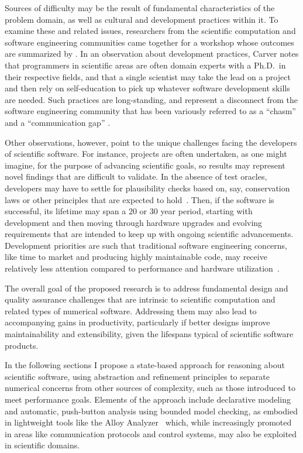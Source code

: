 \documentclass[12pt]{article}
\begin{document}
Sources of difficulty may be the result of fundamental characteristics
of the problem domain, as well as cultural and development practices
within it.  To examine these and related issues, researchers from the
scientific computation and software engineering communities came
together for a workshop whose outcomes are summarized by
\cite{carver2009}.  In an observation about development practices,
Carver notes that programmers in scientific areas are often domain
experts with a Ph.D.\ in their respective fields, and that a single
scientist may take the lead on a project and then rely on
self-education to pick up whatever software development skills are
needed.  Such practices are long-standing, and represent a disconnect
from the software engineering community that has been variously
referred to as a ``chasm'' \citep{kelly2007,sanders2008} and a
``communication gap'' \citep{faulk2009}.

Other observations, however, point to the unique challenges facing the
developers of scientific software.  For instance, projects are often
undertaken, as one might imagine, for the purpose of advancing
scientific goals, so results may represent novel findings that are
difficult to validate.  In the absence of test oracles, developers may
have to settle for plausibility checks based on, say, conservation
laws or other principles that are expected to hold~\citep{storer2017}.
Then, if the software is successful, its lifetime may span a 20 or 30
year period, starting with development and then moving through
hardware upgrades and evolving requirements that are intended to keep
up with ongoing scientific advancements.  Development priorities are
such that traditional software engineering concerns, like time to
market and producing highly maintainable code, may receive relatively
less attention compared to performance and hardware
utilization~\citep{faulk2009}.

The overall goal of the proposed research is to address fundamental
design and quality assurance challenges that are intrinsic to
scientific computation and related types of numerical software.
Addressing them may also lead to accompanying gains in productivity,
particularly if better designs improve maintainability and
extensibility, given the lifespans typical of scientific software
products.

In the following sections I propose a state-based approach for reasoning about scientific software, using abstraction and refinement principles to separate numerical concerns from other sources of complexity, such as those introduced to meet performance goals.  Elements of the approach include declarative modeling and automatic, push-button analysis using bounded model checking, as embodied in lightweight tools like the Alloy Analyzer~\citep{jackson2012} which, while increasingly promoted in areas like communication protocols and control systems, may also be exploited in scientific domains.
\end{document}
